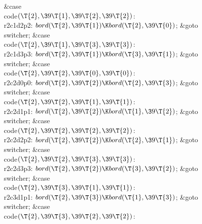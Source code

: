 \4\&{case} \\{code}${}(\T{2},\39\T{1},\39\T{2},\39\T{2}){}$:\5
\\{r2c1d2p2}:\5
${}\\{bord}(\T{2},\39\T{1})\K\\{bord}(\T{2},\39\T{0}){}$;\5
\&{goto} \\{switcher};\6
\4\&{case} \\{code}${}(\T{2},\39\T{1},\39\T{3},\39\T{3}){}$:\5
\\{r2c1d3p3}:\5
${}\\{bord}(\T{2},\39\T{1})\K\\{bord}(\T{3},\39\T{1}){}$;\5
\&{goto} \\{switcher};\6
\4\&{case} \\{code}${}(\T{2},\39\T{2},\39\T{0},\39\T{0}){}$:\5
\\{r2c2d0p0}:\5
${}\\{bord}(\T{2},\39\T{2})\K\\{bord}(\T{2},\39\T{3}){}$;\5
\&{goto} \\{switcher};\6
\4\&{case} \\{code}${}(\T{2},\39\T{2},\39\T{1},\39\T{1}){}$:\5
\\{r2c2d1p1}:\5
${}\\{bord}(\T{2},\39\T{2})\K\\{bord}(\T{1},\39\T{2}){}$;\5
\&{goto} \\{switcher};\6
\4\&{case} \\{code}${}(\T{2},\39\T{2},\39\T{2},\39\T{2}){}$:\5
\\{r2c2d2p2}:\5
${}\\{bord}(\T{2},\39\T{2})\K\\{bord}(\T{2},\39\T{1}){}$;\5
\&{goto} \\{switcher};\6
\4\&{case} \\{code}${}(\T{2},\39\T{2},\39\T{3},\39\T{3}){}$:\5
\\{r2c2d3p3}:\5
${}\\{bord}(\T{2},\39\T{2})\K\\{bord}(\T{3},\39\T{2}){}$;\5
\&{goto} \\{switcher};\6
\4\&{case} \\{code}${}(\T{2},\39\T{3},\39\T{1},\39\T{1}){}$:\5
\\{r2c3d1p1}:\5
${}\\{bord}(\T{2},\39\T{3})\K\\{bord}(\T{1},\39\T{3}){}$;\5
\&{goto} \\{switcher};\6
\4\&{case} \\{code}${}(\T{2},\39\T{3},\39\T{2},\39\T{2}){}$:\5
